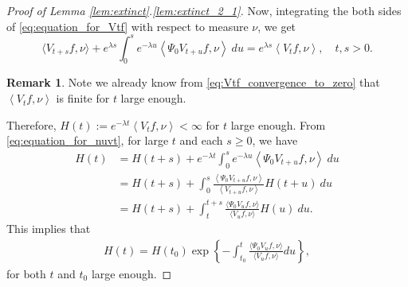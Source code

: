 \documentclass[12pt,a4paper]{amsart}
\numberwithin{equation}{section}
\theoremstyle{plain}
\theoremstyle{definition}
\newtheorem{rem}[thm]{Remark}
\begin{document}
\begin{proof}[Proof of Lemma \ref{lem:extinct}.\eqref{lem:extinct_2_1}]
Now,  integrating the both sides of \eqref{eq:equation_for_Vtf} with respect to measure $\nu$, we get
\begin{equation}\label{eq:equation_for_nuvt}
\langle V_{t+s}f, \nu\rangle + e^{\lambda s}\int_0^s e^{-\lambda u}\left\langle \Psi_0 V_{t+u} f,\nu\right\rangle~du
= e^{\lambda s}\left\langle V_tf,\nu \right\rangle,
\quad t,s > 0.
\end{equation}  
\begin{rem}
\label{rem:Vtfnu_is_finite_when_t_is_large}
Note we already know from \eqref{eq:Vtf_convergence_to_zero} that $\left\langle V_tf,\nu \right\rangle$ is finite for $t$ large enough.
\end{rem}
Therefore, $H(t):=e^{-\lambda t}\left\langle V_tf,\nu \right\rangle<\infty$ for $t$ large enough.
From \eqref{eq:equation_for_nuvt}, for large $t$ and each $s\geq 0$, we have 
\begin{align}
H(t)
&= H(t+s) + e^{-\lambda t}\int_0^{s} e^{-\lambda u} \left\langle\Psi_0 V_{t+u}f,\nu\right\rangle~du
\\&=H(t+s) + \int_0^{s}  \frac{\left\langle\Psi_0 V_{t+u} f,\nu\right\rangle}{ \left\langle V_{t+u} f,\nu \right\rangle } H(t+u)~du   
\\&=H(t+s) + \int_t^{t+s}\frac{\langle\Psi_0 V_uf,\nu\rangle}{\langle V_uf,\nu\rangle}H(u)~du. 
\end{align}
This implies that 
\begin{align}
\label{eq:Ht}
H(t)
=H(t_0) \exp\left\{-\int_{t_0}^t\frac{\langle\Psi_0 V_uf,\nu\rangle}{\langle V_uf,\nu\rangle}du\right\},
\end{align}
for both $t$ and $t_0$ large enough.  


\end{proof}
\end{document}

